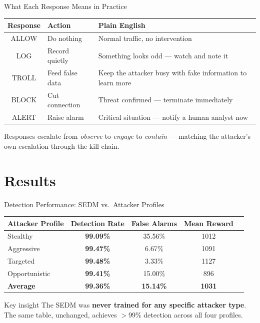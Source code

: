 \documentclass[aspectratio=169, 12pt]{beamer}
\begin{document}
\begin{frame}{What Each Response Means in Practice}
  \begin{table}
    \centering
    \begin{tabular}{clp{6.5cm}}
      \toprule
      \textbf{Response} & \textbf{Action} & \textbf{Plain English} \\
      \midrule
      ALLOW & Do nothing  & Normal traffic, no intervention \\
      LOG   & Record quietly & Something looks odd — watch and note it \\
      TROLL & Feed false data & Keep the attacker busy with fake information to learn more \\
      BLOCK & Cut connection & Threat confirmed — terminate immediately \\
      ALERT & Raise alarm   & Critical situation — notify a human analyst now \\
      \bottomrule
    \end{tabular}
  \end{table}
  \vspace{0.3cm}
  \begin{center}
    \textcolor{honeygrey}{\small Responses escalate from \emph{observe} to \emph{engage} to \emph{contain} —
    matching the attacker's own escalation through the kill chain.}
  \end{center}
\end{frame}

\section{Results}

\begin{frame}{Detection Performance: SEDM vs.\ Attacker Profiles}
  \begin{table}
    \centering
    \begin{tabular}{lcccc}
      \toprule
      \textbf{Attacker Profile} & \textbf{Detection Rate} & \textbf{False Alarms} & \textbf{Mean Reward} \\
      \midrule
      Stealthy      & \textbf{99.09\%} & 35.56\% & 1012 \\
      Aggressive    & \textbf{99.47\%} & 6.67\%  & 1091 \\
      Targeted      & \textbf{99.48\%} & 3.33\%  & 1127 \\
      Opportunistic & \textbf{99.41\%} & 15.00\% & 896  \\
      \midrule
      \textbf{Average} & \textbf{99.36\%} & \textbf{15.14\%} & \textbf{1031} \\
      \bottomrule
    \end{tabular}
  \end{table}
  \vspace{0.3cm}
  \begin{block}{Key insight}
    The SEDM was \textbf{never trained for any specific attacker type}.
    The same table, unchanged, achieves $>$99\% detection across all four profiles.
  \end{block}
\end{frame}
\end{document}
